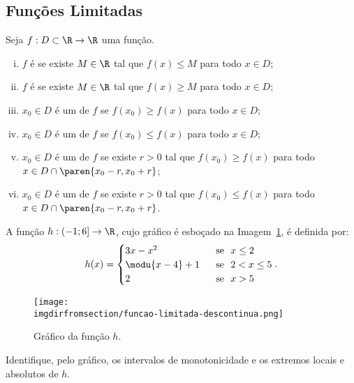 \subsection{Funções Limitadas}

\begin{definition}
    Seja $f: D \subset \R \to \R$ uma função.
\begin{enumerate}[(i)]
  \item $f$ é  se existe $M \in \R$ tal
  que $f(x) \leq M$ para todo $x \in D$;
  \item $f$ é  se existe $M \in \R$ tal
  que $f(x) \geq M$ para todo $x \in D$;
  \item $x_0 \in D$ é um  de $f$ se
  $f(x_0) \geq f(x)$ para todo $x \in D$;
  \item $x_0 \in D$ é um  de $f$ se
  $f(x_0) \leq f(x)$ para todo $x \in D$;
  \item $x_0 \in D$ é um  de $f$ se
  existe $r>0$ tal que $f(x_0) \geq f(x)$ para todo $x \in D \cap \paren{x_0 - r , x_0+r}$;
  \item $x_0 \in D$ é um  de $f$ se
  existe $r>0$ tal que $f(x_0) \leq f(x)$ para todo $x \in D \cap \paren{x_0 - r ,
  x_0+r}$.
\end{enumerate}
\end{definition}

\begin{example}
    A função $h : \left( -1 ; 6 \right] \to \R$, cujo gráfico é esboçado
na Imagem~\ref{img:funcao-limitada-descontinua}, é definida por:
%
$$h(x) = \begin{cases}
                                3x-x^2 & \ \text{ se } \ x\leq 2 \\
                                \modu{x-4} +1 & \ \text{ se } \ 2 < x \leq 5 \\
                                2 & \ \text{ se } \ x > 5 \\
                                \end{cases}.$$
%
\begin{figure}[H]
    \centering
    \texttt{[image: \\imgdirfromsection/funcao-limitada-descontinua.png]}
    \caption{Gráfico da função $h$.}
    \label{img:funcao-limitada-descontinua}
\end{figure}
%
Identifique, pelo gráfico, os intervalos de monotonicidade e os extremos locais e absolutos de $h$.
\end{example}

